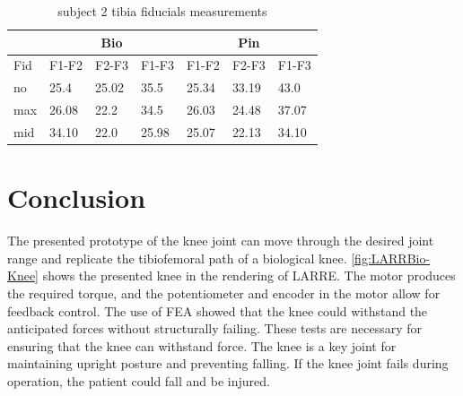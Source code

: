 \begin{table}[]
\centering
\begin{tabular}{ll|lll|lll|}
\cline{3-8}
            &             & \multicolumn{3}{c|}{Bio}   & \multicolumn{3}{c|}{Pin}      \\ \hline
\multicolumn{2}{|l|}{Fid} & \multicolumn{1}{l|}{F1-F2} & \multicolumn{1}{l|}{F2-F3} & F1-F3 & \multicolumn{1}{l|}{F1-F2} & \multicolumn{1}{l|}{F2-F3} & F1-F3 \\ \hline
\multicolumn{2}{|l|}{no}  & \multicolumn{1}{l|}{25.4}      & \multicolumn{1}{l|}{25.02}     & 35.5      & \multicolumn{1}{l|}{25.34}     & \multicolumn{1}{l|}{33.19}     & 43.0      \\ \hline
\multicolumn{2}{|l|}{max} & \multicolumn{1}{l|}{26.08}     & \multicolumn{1}{l|}{22.2}      & 34.5      & \multicolumn{1}{l|}{26.03}     & \multicolumn{1}{l|}{24.48}     & 37.07     \\ \hline
\multicolumn{2}{|l|}{mid} & \multicolumn{1}{l|}{34.10}     & \multicolumn{1}{l|}{22.0}      & 25.98     & \multicolumn{1}{l|}{25.07}     & \multicolumn{1}{l|}{22.13}     & 34.10     \\ \hline
\end{tabular}
\caption{subject 2 tibia fiducials measurements }
\label{tab:sub2_tibia}
\end{table}






\section{Conclusion}

The presented prototype of the knee joint can move through the desired joint range and replicate the tibiofemoral path of a biological knee. \autoref{fig:LARRBio-Knee} shows the presented knee in the rendering of LARRE. The motor produces the required torque, and the potentiometer and encoder in the motor allow for feedback control. The use of FEA showed that the knee could withstand the anticipated forces without structurally failing. These tests are necessary for ensuring that the knee can withstand force. The knee is a key joint for maintaining upright posture and preventing falling. If the knee joint fails during operation, the patient could fall and be injured. 

